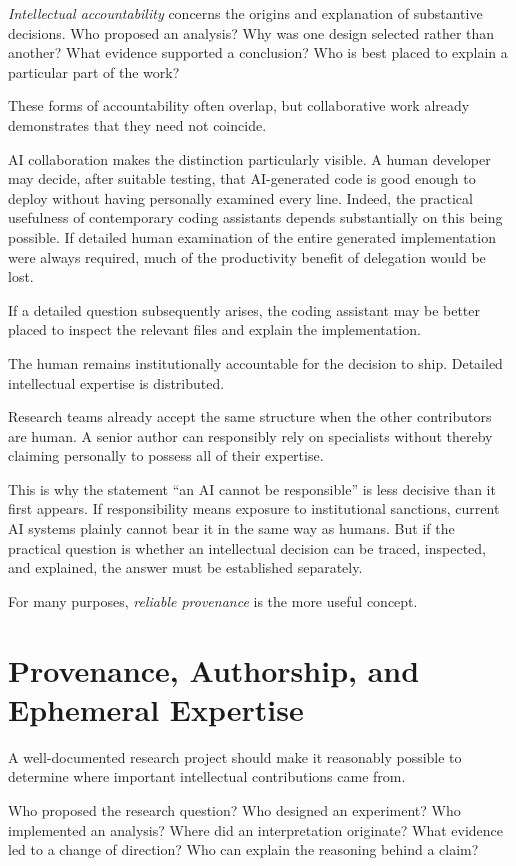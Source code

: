 \documentclass[12pt]{article}
\begin{document}
\emph{Intellectual accountability} concerns the origins and explanation of substantive decisions. Who proposed an analysis? Why was one design selected rather than another? What evidence supported a conclusion? Who is best placed to explain a particular part of the work?

These forms of accountability often overlap, but collaborative work already demonstrates that they need not coincide.

AI collaboration makes the distinction particularly visible. A human developer may decide, after suitable testing, that AI-generated code is good enough to deploy without having personally examined every line. Indeed, the practical usefulness of contemporary coding assistants depends substantially on this being possible. If detailed human examination of the entire generated implementation were always required, much of the productivity benefit of delegation would be lost.

If a detailed question subsequently arises, the coding assistant may be better placed to inspect the relevant files and explain the implementation.

The human remains institutionally accountable for the decision to ship. Detailed intellectual expertise is distributed.

Research teams already accept the same structure when the other contributors are human. A senior author can responsibly rely on specialists without thereby claiming personally to possess all of their expertise.

This is why the statement ``an AI cannot be responsible'' is less decisive than it first appears. If responsibility means exposure to institutional sanctions, current AI systems plainly cannot bear it in the same way as humans. But if the practical question is whether an intellectual decision can be traced, inspected, and explained, the answer must be established separately.

For many purposes, \emph{reliable provenance} is the more useful concept.


\section{Provenance, Authorship, and Ephemeral Expertise}

A well-documented research project should make it reasonably possible to determine where important intellectual contributions came from.

Who proposed the research question? Who designed an experiment? Who implemented an analysis? Where did an interpretation originate? What evidence led to a change of direction? Who can explain the reasoning behind a claim?
\end{document}
